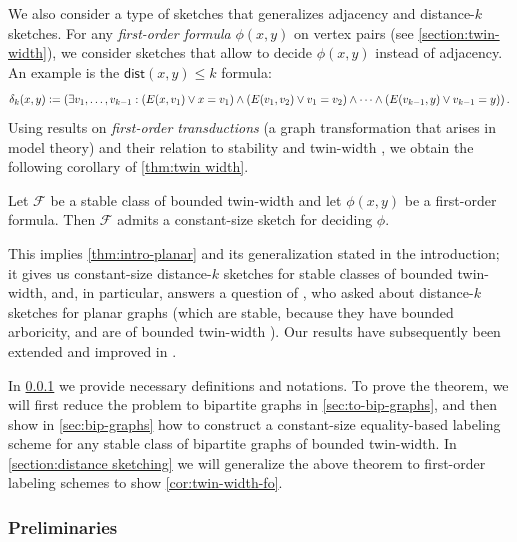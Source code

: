 \documentclass{theoretics}
\makeatletter
\newcommand{\dist}{\mathsf{dist}}
\newcommand{\define}{\vcentcolon=}
\newcommand{\cF}{\ensuremath{\mathcal{F}}}
\newcommand\IfRestateTF{%
  \ifx\label\thmt@gobble@label %
    \expandafter\@firstoftwo
  \else
    \expandafter\@secondoftwo
  \fi
}
\newcommand{\RestateRemark}{\IfRestateTF{{\normalfont\bfseries (Restated) }}{}}
\makeatother
\begin{document}

We also consider a type of sketches that generalizes adjacency and distance-$k$ sketches.  For any
\emph{first-order formula} $\phi(x,y)$ on vertex pairs (see \cref{section:twin-width}), we consider
sketches that allow to decide $\phi(x,y)$ instead of adjacency. An example is the $\dist(x,y) \leq
k$ formula:
\[
  \delta_k(x,y) \define (\exists v_1, \dotsc, v_{k-1} : (E(x,v_1) \vee x=v_1) \wedge
(E(v_1,v_2) \vee v_1=v_2) \wedge
\dotsm \wedge (E(v_{k-1},y) \vee v_{k-1}=y)) \,.
\]
Using results on \emph{first-order transductions} (a graph transformation that arises in model
theory) and their relation to stability and twin-width \cite{BKTW20,NMP+21}, we
obtain the following corollary of \cref{thm:twin width}.

\begin{corollary}
\label{cor:twin-width-fo}
Let $\cF$ be a stable class of bounded twin-width and let $\phi(x,y)$ be a first-order formula.
Then $\cF$ admits a constant-size sketch for deciding $\phi$.
\end{corollary}

This implies
\cref{thm:intro-planar} and its generalization stated in the introduction; it gives us constant-size
distance-$k$ sketches for stable classes of bounded twin-width, and, in particular, answers a
question of \cite{Har20}, who asked about distance-$k$ sketches for planar graphs (which are stable,
because they have bounded arboricity, and are of bounded twin-width \cite{BKTW20}).  Our results
have subsequently been extended and improved in \cite{EHK22}.

In \cref{sec:tw-prelim} we provide necessary definitions and notations.
To prove the theorem, we will first reduce the problem to bipartite graphs in
\cref{sec:to-bip-graphs}, and then show in \cref{sec:bip-graphs} how to construct a constant-size
equality-based labeling scheme for any stable class of bipartite graphs of bounded twin-width.
In \cref{section:distance sketching} we will generalize the above theorem to first-order labeling
schemes to show \cref{cor:twin-width-fo}.


\subsubsection{Preliminaries}\label{sec:tw-prelim}
\end{document}
